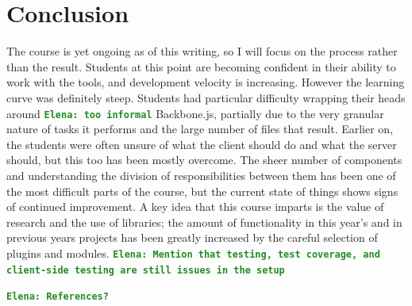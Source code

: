 \documentclass[12pt]{article}
\newcommand{\comment}[1]{{\bf \tt  {#1}}}
\newcommand{\emcomment}[1]{\textcolor{ForestGreen}{\comment{Elena: {#1}}}}
\begin{document}
\section{Conclusion}\label{sec:conclusion}
The course is yet ongoing as of this writing, so I will focus on the process rather than the result. Students at this point are becoming confident in their ability to work with the tools, and development velocity is increasing. However the learning curve was definitely steep. Students had particular difficulty wrapping their heads around \emcomment{too informal} Backbone.js, partially due to the very granular nature of tasks it performs and the large number of files that result. Earlier on, the students were often unsure of what the client should do and what the server should, but this too has been mostly overcome. The sheer number of components and understanding the division of responsibilities between them has been one of the most  difficult parts of the course, but the current state of things shows signs of continued improvement. A key idea that this course imparts is the value of research and the use of libraries; the amount of functionality in this year's and in previous years projects has been greatly increased by the careful selection of plugins and modules.
\emcomment{Mention that testing, test coverage, and client-side testing are still issues in the setup}

\emcomment{References?}



%
%




%  
%
%


\end{document}

